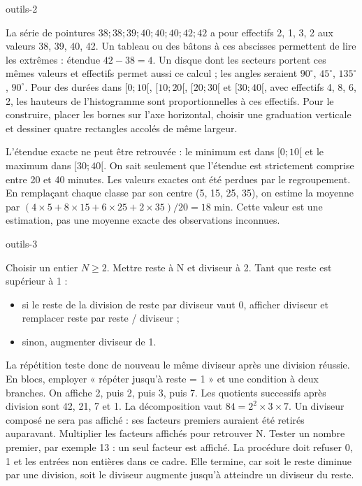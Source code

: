 \begin{blocEdition}{outils-2}

La série de pointures $38;38;39;40;40;40;42;42$ a pour effectifs
2, 1, 3, 2 aux valeurs 38, 39, 40, 42. Un tableau ou des bâtons
à ces abscisses permettent de lire les extrêmes : étendue $42-38=4$.
Un disque dont les secteurs portent ces mêmes valeurs et effectifs
permet aussi ce calcul ; les angles seraient $90^\circ$, $45^\circ$,
$135^\circ$, $90^\circ$.
Pour des durées dans $[0;10[$, $[10;20[$, $[20;30[$ et $[30;40[$,
avec effectifs 4, 8, 6, 2, les hauteurs de l’histogramme sont
proportionnelles à ces effectifs. Pour le construire, placer les bornes
sur l’axe horizontal, choisir une graduation verticale et dessiner quatre
rectangles accolés de même largeur.\par\medskip
L’étendue exacte ne peut être retrouvée : le minimum est dans $[0;10[$
et le maximum dans $[30;40[$. On sait seulement que l’étendue est
strictement comprise entre 20 et 40 minutes. Les valeurs exactes ont été
perdues par le regroupement.
En remplaçant chaque classe par son centre (5, 15, 25, 35),
on estime la moyenne par $(4\times5+8\times15+6\times25+2\times35)/20=18$ min.
Cette valeur est une estimation, pas une moyenne exacte des observations inconnues.

\end{blocEdition}
\begin{blocEdition}{outils-3}

Choisir un entier $N\ge2$. Mettre reste à N et diviseur à 2.
Tant que reste est supérieur à 1 :\par
\begin{itemize}
\item si le reste de la division de reste par diviseur vaut 0, afficher
diviseur et remplacer reste par reste / diviseur ;
\item sinon, augmenter diviseur de 1.
\end{itemize}
La répétition teste donc de nouveau le même diviseur après une division réussie.
En blocs, employer « répéter jusqu’à reste = 1 » et une condition à deux branches.
On affiche 2, puis 2, puis 3, puis 7. Les quotients successifs après
division sont 42, 21, 7 et 1. La décomposition vaut
$84=2^2\times3\times7$. Un diviseur composé ne sera pas affiché :
ses facteurs premiers auraient été retirés auparavant.
Multiplier les facteurs affichés pour retrouver N.
Tester un nombre premier, par exemple 13 : un seul facteur est affiché.
La procédure doit refuser 0, 1 et les entrées non entières dans ce cadre.
Elle termine, car soit le reste diminue par une division, soit le diviseur
augmente jusqu’à atteindre un diviseur du reste.

\end{blocEdition}
